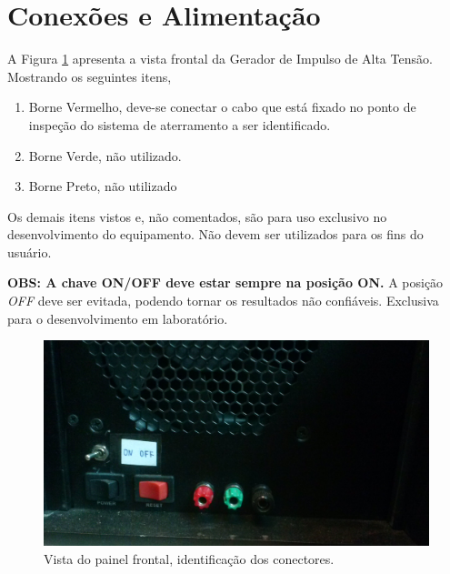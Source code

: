 \documentclass[a4paper, 10pt]{article}
\begin{document}
\section{Conexões e Alimentação}

A Figura \ref{fig_painel_frontal} apresenta a vista frontal da Gerador de 
Impulso de Alta Tensão.
Mostrando os seguintes itens, 

\begin{enumerate}
    \item Borne Vermelho, deve-se conectar o cabo que está fixado no 
        ponto de inspeção do sistema de aterramento a ser identificado.
    \item Borne Verde, não utilizado.
    \item Borne Preto, não utilizado
\end{enumerate}

Os demais itens vistos e, não comentados, são para uso exclusivo no desenvolvimento do equipamento. Não devem
ser utilizados para os fins do usuário. 

\textbf{OBS: A chave ON/OFF deve estar sempre na posição ON.} A posição \textit{OFF} deve ser 
evitada, podendo tornar os resultados não confiáveis. Exclusiva para o desenvolvimento
em laboratório.

\begin{figure}[!h]
        \caption{\label{fig_painel_frontal} Vista do painel frontal, identificação dos conectores.}
	    \begin{center}
            \includegraphics[scale=0.1]{../fotos/painel_frontal.jpg}
	    \end{center}
\end{figure}

\end{document}

